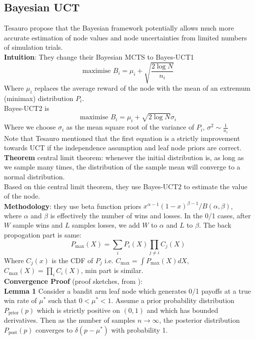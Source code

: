 \documentclass[11pt]{article}
\theoremstyle{definitionstyle}
\begin{document}
\subsection{Bayesian UCT}
Tesauro\cite{tesauro2012bayesian} propose that the Bayesian framework potentially allows much more accurate estimation of node values and node uncertainties from limited numbers of simulation trials.\\
\textbf{Intuition}: They change their Bayesian MCTS to Bayes-UCT1
\[
    \text{maximise } B_i=\mu_i+\sqrt{\frac{2\log N}{n_i}}
\]
Where $\mu_i$ replaces the average reward of the node with the mean of an extremum (minimax) distribution $P_i$.\\
Bayes-UCT2 is
\[
    \text{maximise } B_i=\mu_i+\sqrt{2\log N}\sigma_i
\]
Where we choose $\sigma_i$ as the mean square root of the variance of $P_i$, $\sigma^2\sim\frac{1}{n_i}$\\
Note that Tesauro mentioned that the first equation is a strictly improvement towards UCT if the independence assumption
and leaf node priors are correct.\\
\textbf{Theorem} central limit theorem: whenever the initial distribution is, as long as we sample many times, the distribution of the sample mean will converge to a normal distribution.\\
Based on thie central limit theorem, they use Bayes-UCT2 to estimate the value of the node.\\
\textbf{Methodology}: they use beta function priors $x^{\alpha-1}(1-x)^{\beta-1}/B(\alpha,\beta)$, where $\alpha$ and $\beta$ is effectively the number of wins and losses. In the 0/1 cases, after $W$ sample wins and $L$ samples losses, we add $W$ to $\alpha$ and $L$ to $\beta$. The back propogation part is same:
\[
    P_{\text{max}}(X)=\sum_i P_i(X)\prod_{j\neq i}C_j(X)
\]
Where $C_j(x)$ is the CDF of $P_j$ i.e. $C_\text{max}=\int P_\text{max}(X)dX$, $C_\text{max}(X)=\prod_i C_i(X)$, min part is similar.\\
\textbf{Convergence Proof} (proof sketches, from \cite{tesauro2012bayesian}):\\
\textbf{Lemma 1} Consider a bandit arm leaf node which generates 0/1 payoffs at a true win rate of $\mu^*$ such that $0 < \mu^* < 1$. Assume a prior probability distribution $P_{\text{prior}}(p)$ which is strictly positive on $(0, 1)$ and which has bounded derivatives. Then as the number of samples $n \to \infty$, the posterior distribution $P_{\text{post}}(p)$ converges to $\delta(p - \mu^*)$ with probability 1.\\
\end{document}
